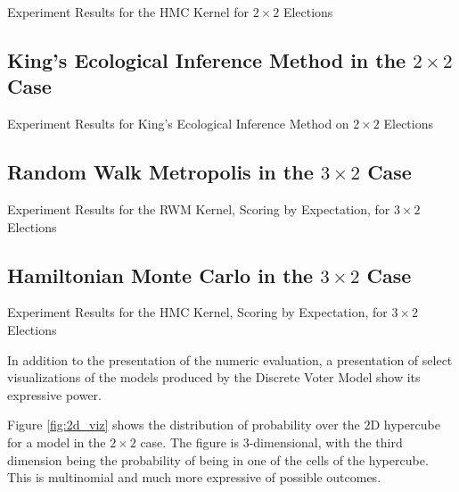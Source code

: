 \begin{table}[ht]
  \centering
  \caption{Experiment Results for the HMC Kernel for $2 \times 2$ Elections}
  \label{table:hmc_2d}
  
\end{table}


\FloatBarrier
\subsection{King's Ecological Inference Method in the $2 \times 2$ Case}


\begin{table}[ht]
  \centering
  \caption{Experiment Results for King's Ecological Inference Method on $2 \times 2$ Elections}
  \label{table:kei_results}
  
\end{table}


\FloatBarrier
\subsection{Random Walk Metropolis in the $3 \times 2$ Case}

\begin{table}[ht]
  \centering
  \caption{Experiment Results for the RWM Kernel, Scoring by Expectation, for $3 \times 2$ Elections}
  \label{table:rwm_3d}
  
\end{table}


\FloatBarrier
\subsection{Hamiltonian Monte Carlo in the $3 \times 2$ Case}


\begin{table}[ht]
  \centering
  \caption{Experiment Results for the HMC Kernel, Scoring by Expectation, for $3 \times 2$ Elections}
  \label{table:hmc_3d}
  
\end{table}


In addition to the presentation of the numeric evaluation, a presentation of select visualizations of the models produced by the Discrete Voter Model show its expressive power.

Figure \ref{fig:2d_viz} shows the distribution of probability over the $2$D hypercube for a model in the $2 \times 2$ case. The figure is $3$-dimensional, with the third dimension being the probability of being in one of the cells of the hypercube. This is multinomial and much more expressive of possible outcomes.

